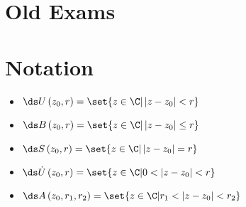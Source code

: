 \documentclass[10pt]{mypackage}
\begin{document}
\section{Old Exams}%
\section{Notation}%
\begin{itemize}
  \item $\ds U\left( z_0,r \right) = \set{z\in \C | \left\vert z-z_0 \right\vert < r}$
  \item $\ds B\left( z_0,r \right) = \set{z\in \C | \left\vert z-z_0 \right\vert \leq r}$
  \item $\ds S\left( z_0,r \right) = \set{z\in \C | \left\vert z-z_0 \right\vert = r}$
  \item $\ds \dot{U}\left( z_0,r \right) = \set{z\in \C | 0 < \left\vert z-z_0 \right\vert < r}$
  \item $\ds A\left( z_0,r_1,r_2 \right) = \set{z\in \C | r_1 < \left\vert z-z_0 \right\vert < r_2}$
\end{itemize}
\end{document}
